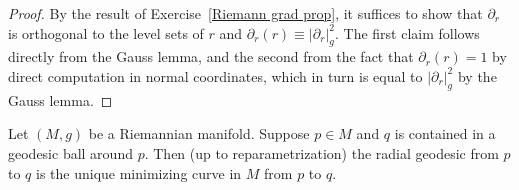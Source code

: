 \begin{proof}
By the result of Exercise~\ref{Riemann grad prop}, it suffices to show that $\partial_r$ is orthogonal to the level sets of $r$ and $\partial_r(r)\equiv|\partial_r|_g^2$. The first claim follows directly from the Gauss lemma, and the second from the fact that $\partial_r(r)=1$ by direct computation in normal coordinates, which in turn is equal to $|\partial_r|_g^2$ by the Gauss lemma.
\end{proof}
\begin{proposition}\label{Riemann geodesic ball radial is minimize}
Let $(M,g)$ be a Riemannian manifold. Suppose $p\in M$ and $q$ is contained in a geodesic ball around $p$. Then (up to reparametrization) the radial geodesic from $p$ 
to $q$ is the unique minimizing curve in $M$ from $p$ to $q$.
\end{proposition}
